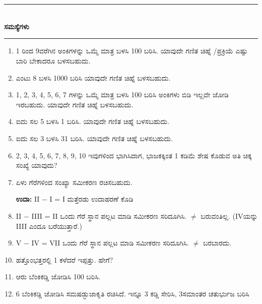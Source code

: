 \chapter[ಅಧ್ಯಾಯ 3]{}\label{chap3}

\begin{center}
\rule{5cm}{1pt}\\[5pt]
{\Large\bfseries ಸಮಸ್ಯೆಗಳು}\\[3pt]
\rule{5cm}{1pt}
\end{center}

\smallskip
\begin{enumerate}
\renewcommand{\labelenumi}{\bf\theenumi.}
\itemsep=5pt
\item 1 ರಿಂದ 9ವರೆಗಿನ ಅಂಕಿಗಳನ್ನು ಒಮ್ಮೆ ಮಾತ್ರ ಬಳಸಿ 100 ಬರಿಸಿ. ಯಾವುದೇ ಗಣಿತ ಚಿಹ್ನೆ /ಪ್ರಕ್ರಿಯೆ ಎಷ್ಟು ಬಾರಿ ಬೇಕಾದರೂ ಬಳಸಬಹುದು.

\item ಎಂಟು 8 ಬಳಸಿ 1000 ಬರಿಸಿ ಯಾವುದೇ ಗಣಿತ ಚಿಹ್ನೆ ಬಳಸಬಹುದು.

\item 1, 2, 3, 4, 5, 6, 7 ಗಳನ್ನು ಒಮ್ಮೆ ಮಾತ್ರ ಬಳಸಿ 100 ಬರಿಸಿ ಅಂಕಿಗಳು ಬಿಡಿ ಇಲ್ಲವೇ ಜೋಡಿ ಇರಬಹುದು. ಯಾವುದೇ ಗಣಿತ ಚಿಹ್ನೆ ಬಳಸಬಹುದು.

\item ಐದು ಸಲ 5 ಬಳಸಿ 1  ಬರಿಸಿ. ಯಾವುದೇ ಗಣಿತ ಚಿಹ್ನೆ ಬಳಸಬಹುದು.

\item ಐದು ಸಲ 3 ಬಳಸಿ 31 ಬರಿಸಿ. ಯಾವುದೇ ಗಣಿತ ಚಿಹ್ನೆ  ಬಳಸಬಹುದು. 

\item 2, 3, 4, 5, 6, 7, 8, 9, 10 ಇವುಗಳಿಂದ ಭಾಗಿಸಿದಾಗ, ಭಾಜಕಕ್ಕಿಂತ 1 ಕಡಿಮೆ ಶೇಷ ಕೊಡುವ ಅತಿ ಚಿಕ್ಕ ಸಂಖ್ಯೆ ಯಾವುದು? 

\item ಏಳು ಗೆರೆಗಳಿಂದ ಸಂಖ್ಯಾ ಸಮೀಕರಣ ರಚಿಸಬಹುದು. 

{\bf ಉದಾ:} II $-$ I = I ಮತ್ತೆರಡು ಉದಾಹರಣೆ ಕೊಡಿ

\item II $-$ IIII = II ಒಂದು ಗೆರೆ ಸ್ಥಾನ ಪಲ್ಲಟ ಮಾಡಿ ಸಮೀಕರಣ ಸರಿದೂಗಿಸಿ. $\neq$ ಬರುವಂತಿಲ್ಲ. (IVಯನ್ನು IIII ಎಂದೂ ಬರೆಯುತ್ತಾರೆ.) 

\item V $-$ IV = VII ಒಂದು ಗೆರೆ ಸ್ಥಾನ ಪಲ್ಲಟ ಮಾಡಿ ಸಮೀಕರಣ ಸರಿದೂಗಿಸಿ. $\neq$ ಬರಬಾರದು.

\item ಹತ್ತೊಂಭತ್ತರಲ್ಲಿ 1 ಕಳೆದರೆ ಇಪ್ಪತ್ತು. ಹೇಗೆ?

\item ಆರು ಬೆಂಕಿಕಡ್ಡಿ ಜೋಡಿಸಿ 100 ಬರಿಸಿ.

\item 6 ಬೆಂಕಿಕಡ್ಡಿ ಜೋಡಿಸಿ ಸಮಷಡ್ಭುಜಾಕೃತಿ ರಚಿಸಿದೆ. ಇನ್ನೂ 3 ಕಡ್ಡಿ  ಸೇರಿಸಿ, 3\break ಸಮಾಂತರ ಚತುರ್ಭುಜ ಬರಿಸಿ 


\end{enumerate}

